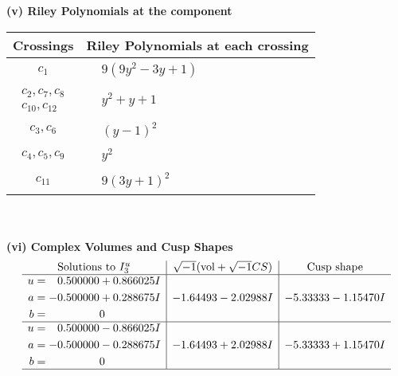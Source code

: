 \documentclass[1p]{elsarticle_modified}
\theoremstyle{definition}
\newcommand{\I}{\sqrt{-1}}
\begin{document}
\newpage\renewcommand{\arraystretch}{1}
\flushleft \textbf{(v) Riley Polynomials at the component}\newline \\
\begin{tabular}{m{50pt}|m{274pt}}
Crossings & \hspace{64pt}Riley Polynomials at each crossing \\
\hline $$\begin{aligned}c_{1}\end{aligned}$$&$\begin{aligned}
&9(9 y^2-3 y+1)
\end{aligned}$\\
\hline $$\begin{aligned}c_{2},c_{7},c_{8}\\c_{10},c_{12}\end{aligned}$$&$\begin{aligned}
&y^2+y+1
\end{aligned}$\\
\hline $$\begin{aligned}c_{3},c_{6}\end{aligned}$$&$\begin{aligned}
&(y-1)^2
\end{aligned}$\\
\hline $$\begin{aligned}c_{4},c_{5},c_{9}\end{aligned}$$&$\begin{aligned}
&y^2
\end{aligned}$\\
\hline $$\begin{aligned}c_{11}\end{aligned}$$&$\begin{aligned}
&9(3 y+1)^2
\end{aligned}$\\
\hline
\end{tabular}\\~\\
\newpage\flushleft \textbf{(vi) Complex Volumes and Cusp Shapes}
$$\begin{array}{c|c|c}  
\text{Solutions to }I^u_{3}& \I (\text{vol} + \sqrt{-1}CS) & \text{Cusp shape}\\
 \hline 
\begin{aligned}
u &= \phantom{-}0.500000 + 0.866025 I \\
a &= -0.500000 + 0.288675 I \\
b &= \phantom{-0.000000 } 0\end{aligned}
 & -1.64493 - 2.02988 I & -5.33333 - 1.15470 I \\ \hline\begin{aligned}
u &= \phantom{-}0.500000 - 0.866025 I \\
a &= -0.500000 - 0.288675 I \\
b &= \phantom{-0.000000 } 0\end{aligned}
 & -1.64493 + 2.02988 I & -5.33333 + 1.15470 I\\
 \hline 
 \end{array}$$\newpage
\end{document}
